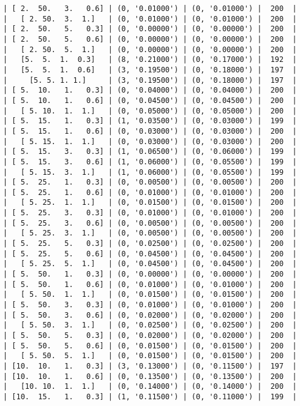 \documentclass{article}
\begin{document}
\begin{verbatim}
| [ 2.  50.   3.   0.6] | (0, '0.01000') | (0, '0.01000') |  200  |
|   [ 2. 50.  3.  1.]   | (0, '0.01000') | (0, '0.01000') |  200  |
| [ 2.  50.   5.   0.3] | (0, '0.00000') | (0, '0.00000') |  200  |
| [ 2.  50.   5.   0.6] | (0, '0.00000') | (0, '0.00000') |  200  |
|   [ 2. 50.  5.  1.]   | (0, '0.00000') | (0, '0.00000') |  200  |
|   [5.  5.  1.  0.3]   | (8, '0.21000') | (0, '0.17000') |  192  |
|   [5.  5.  1.  0.6]   | (3, '0.19500') | (0, '0.18000') |  197  |
|     [5. 5. 1. 1.]     | (3, '0.19500') | (0, '0.18000') |  197  |
| [ 5.  10.   1.   0.3] | (0, '0.04000') | (0, '0.04000') |  200  |
| [ 5.  10.   1.   0.6] | (0, '0.04500') | (0, '0.04500') |  200  |
|   [ 5. 10.  1.  1.]   | (0, '0.05000') | (0, '0.05000') |  200  |
| [ 5.  15.   1.   0.3] | (1, '0.03500') | (0, '0.03000') |  199  |
| [ 5.  15.   1.   0.6] | (0, '0.03000') | (0, '0.03000') |  200  |
|   [ 5. 15.  1.  1.]   | (0, '0.03000') | (0, '0.03000') |  200  |
| [ 5.  15.   3.   0.3] | (1, '0.06500') | (0, '0.06000') |  199  |
| [ 5.  15.   3.   0.6] | (1, '0.06000') | (0, '0.05500') |  199  |
|   [ 5. 15.  3.  1.]   | (1, '0.06000') | (0, '0.05500') |  199  |
| [ 5.  25.   1.   0.3] | (0, '0.00500') | (0, '0.00500') |  200  |
| [ 5.  25.   1.   0.6] | (0, '0.01000') | (0, '0.01000') |  200  |
|   [ 5. 25.  1.  1.]   | (0, '0.01500') | (0, '0.01500') |  200  |
| [ 5.  25.   3.   0.3] | (0, '0.01000') | (0, '0.01000') |  200  |
| [ 5.  25.   3.   0.6] | (0, '0.00500') | (0, '0.00500') |  200  |
|   [ 5. 25.  3.  1.]   | (0, '0.00500') | (0, '0.00500') |  200  |
| [ 5.  25.   5.   0.3] | (0, '0.02500') | (0, '0.02500') |  200  |
| [ 5.  25.   5.   0.6] | (0, '0.04500') | (0, '0.04500') |  200  |
|   [ 5. 25.  5.  1.]   | (0, '0.04500') | (0, '0.04500') |  200  |
| [ 5.  50.   1.   0.3] | (0, '0.00000') | (0, '0.00000') |  200  |
| [ 5.  50.   1.   0.6] | (0, '0.01000') | (0, '0.01000') |  200  |
|   [ 5. 50.  1.  1.]   | (0, '0.01500') | (0, '0.01500') |  200  |
| [ 5.  50.   3.   0.3] | (0, '0.01000') | (0, '0.01000') |  200  |
| [ 5.  50.   3.   0.6] | (0, '0.02000') | (0, '0.02000') |  200  |
|   [ 5. 50.  3.  1.]   | (0, '0.02500') | (0, '0.02500') |  200  |
| [ 5.  50.   5.   0.3] | (0, '0.02000') | (0, '0.02000') |  200  |
| [ 5.  50.   5.   0.6] | (0, '0.01500') | (0, '0.01500') |  200  |
|   [ 5. 50.  5.  1.]   | (0, '0.01500') | (0, '0.01500') |  200  |
| [10.  10.   1.   0.3] | (3, '0.13000') | (0, '0.11500') |  197  |
| [10.  10.   1.   0.6] | (0, '0.13500') | (0, '0.13500') |  200  |
|   [10. 10.  1.  1.]   | (0, '0.14000') | (0, '0.14000') |  200  |
| [10.  15.   1.   0.3] | (1, '0.11500') | (0, '0.11000') |  199  |

\end{verbatim}
\end{document}
